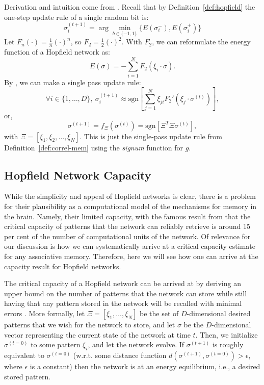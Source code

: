 \documentclass{article}
\theoremstyle{definition}
\begin{document}
Derivation and intuition come from \textcite{krotov_modern_2025}.
Recall that by Definition~\ref{def:hopfield} the one-step update rule of a
single random bit is:
\begin{equation}\label{proof:random-update}
  \sigma_i^{(t+1)} = \arg\min_{b \in \{-1, 1\}} \{ E(\sigma_i^-),
  E(\sigma_i^+) \}
\end{equation}
Let $F_n (\cdot) = \frac{1}{n} (\cdot)^n$, so $F_2 = \frac{1}{2} (\cdot)^2$.
With $F_2$, we can reformulate the energy function of a Hopfield network as:
\begin{equation}\label{hopfield:f_n}
  E(\sigma) = - \sum^N_{i=1} F_2 (\xi_i \cdot \sigma).
\end{equation}
By \textcite{krotov_modern_2025}, we can make a single pass update rule:
\begin{equation}\label{eq:krotov-energy-deriv}
  \forall i \in \{1, \dots, D\},~\sigma_i^{(t+1)} \approx
  \text{sgn} \left[ \sum^N_{j=1} \xi_{ji} F_2' \left( \xi_j \cdot
  \sigma^{(t)}  \right) \right],
\end{equation}
or,
\begin{equation}
  \sigma^{(t+1)} = f_\Xi (\sigma^{(t)}) = \text{sgn} \left[ \Xi^T
  \Xi \sigma^{(t)} \right],
\end{equation}
with $\Xi = [\xi_1, \xi_2, \dots, \xi_N]$.
This is just the single-pass update rule from Definition~\ref{def:correl-mem}
using the \textit{signum} function for $g$.

\subsection{Hopfield Network Capacity}\label{sec:hopfield-cap}

While the simplicity and appeal of Hopfield networks is clear, there
is a problem
for their plausibility as a computational model of the mechanisms for memory in
the brain. Namely, their limited capacity, with the famous result from
\textcite{hopfield_neural_1982} that the critical capacity of patterns
that the network can reliably retrieve is around 15 per cent of the
number of computational
units of the network. Of relevance for our discussion is how we can
systematically
arrive at a critical capacity estimate for any associative memory. Therefore,
here we will see how one can arrive at the capacity result for
Hopfield networks.

The critical capacity of a Hopfield network can be arrived at by deriving
an upper bound on the number of patterns that the network can store while
still having that any pattern stored in the network will be recalled
with minimal
errors \parencites{krotov_dense_2016,demircigil_model_2017,krotov_modern_2025}.
More formally, let $\Xi = [\xi_1, \dots, \xi_N]$ be the set of
$D$-dimensional desired
patterns that we wish for the network to store, and let $\sigma$ be the
$D$-dimensional vector representing the current state of the network
at time $t$.
Then, we initialize $\sigma^{(t=0)}$ to some pattern $\xi_i$, and let the
network evolve. If $\sigma^{(t+1)}$ is roughly equivalent to $\sigma^{(t=0)}$
(w.r.t. some distance function $d(\sigma^{(t+1)}, \sigma^{(t=0)}) >
  \epsilon$, where $\epsilon$
is a constant) then the network is at an energy equilibrium, i.e., a
desired stored pattern.
\end{document}
